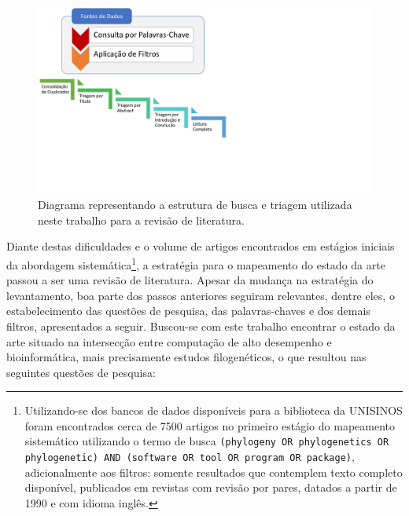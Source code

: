\documentclass[english,brazilian]{UNISINOSmonografia} %
\newcommand\defaultFigureWidth{0.9}
\begin{document}
\begin{figure}[tb]
\centering%
\begin{minipage}{\defaultFigureWidth\textwidth}
	\caption{Diagrama representando a estrutura de busca e triagem utilizada neste trabalho para a revisão de literatura.}
	\label{fig:survey-pipeline}
	\includegraphics[trim=0 160 420 0,clip,width=\textwidth]{survey-pipeline}
\end{minipage}
\end{figure}


Diante destas dificuldades e o volume de artigos encontrados em estágios iniciais da abordagem sistemática\footnote{
	Utilizando-se dos bancos de dados disponíveis para a biblioteca da UNISINOS foram encontrados cerca de 7500 artigos no primeiro estágio do mapeamento sistemático utilizando o termo de busca \texttt{(phylogeny OR phylogenetics OR phylogenetic) AND (software OR tool OR program OR package)}, adicionalmente aos filtros: somente resultados que contemplem texto completo disponível, publicados em revistas com revisão por pares, datados a partir de 1990 e com idioma inglês.
}, a estratégia para o mapeamento do estado da arte passou a ser uma revisão de literatura.
Apesar da mudança na estratégia do levantamento, boa parte dos passos anteriores seguiram relevantes, dentre eles, o estabelecimento das questões de pesquisa, das palavras-chaves e dos demais filtros, apresentados a seguir.
Buscou-se com este trabalho encontrar o estado da arte situado na intersecção entre computação de alto desempenho e bioinformática, mais precisamente estudos filogenéticos, o que resultou nas seguintes questões de pesquisa:
\end{document}
